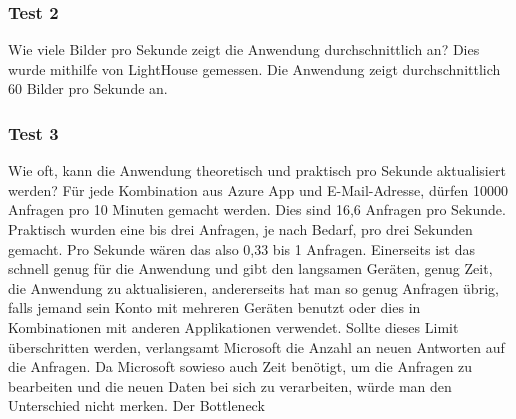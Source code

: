 \subsubsection{Test 2}\label{subsubsec:test-2}
\newline
\newline
Wie viele Bilder pro Sekunde zeigt die Anwendung durchschnittlich an?
Dies wurde mithilfe von LightHouse gemessen.
Die Anwendung zeigt durchschnittlich 60 Bilder pro Sekunde an.
\newline
\newline
\subsubsection{Test 3}\label{subsubsec:test-3}
\newline
\newline
Wie oft, kann die Anwendung theoretisch und praktisch pro Sekunde aktualisiert werden?
Für jede Kombination aus Azure App und E-Mail-Adresse, dürfen 10000 Anfragen pro 10 Minuten gemacht werden.
Dies sind 16,6 Anfragen pro Sekunde.
Praktisch wurden eine bis drei Anfragen, je nach Bedarf, pro drei Sekunden gemacht.
Pro Sekunde wären das also 0,33 bis 1 Anfragen.
Einerseits ist das schnell genug für die Anwendung und gibt den langsamen Geräten, genug Zeit, die Anwendung zu aktualisieren, andererseits hat man so genug Anfragen übrig, falls jemand sein Konto mit mehreren Geräten benutzt oder dies in Kombinationen mit anderen Applikationen verwendet.
Sollte dieses Limit überschritten werden, verlangsamt Microsoft die Anzahl an neuen Antworten auf die Anfragen.
Da Microsoft sowieso auch Zeit benötigt, um die Anfragen zu bearbeiten und die neuen Daten bei sich zu verarbeiten, würde man den Unterschied nicht merken.
Der Bottleneck \
\newline
\newline
